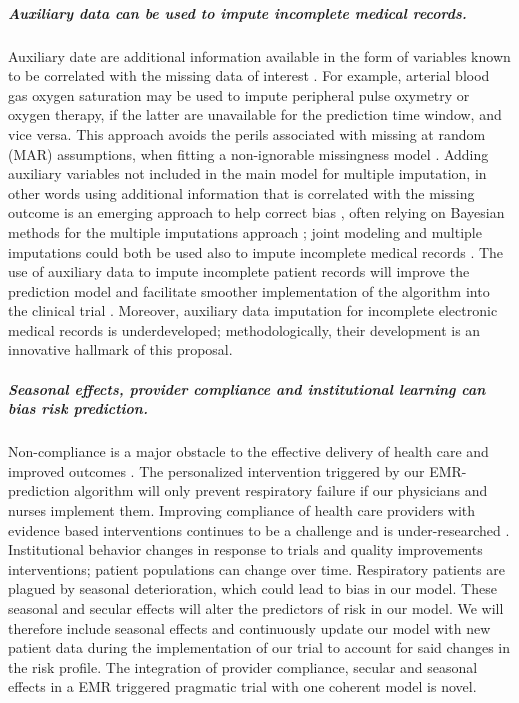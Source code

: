 \documentclass[11pt,notitlepage]{article}
\begin{document}
\subparagraph*{Auxiliary data can be used to impute incomplete medical records.}
Auxiliary date are additional information available in the form of variables known to be correlated with the missing data of interest \cite{Daniels24571539}. For example, arterial blood gas oxygen saturation may be used to impute peripheral pulse oxymetry or oxygen therapy, if the latter are unavailable for the prediction time window, and vice versa. This approach avoids the perils associated with missing at random (MAR) assumptions, when fitting a non-ignorable missingness model \cite{Wang_20029935}. Adding auxiliary variables not included in the main model for multiple imputation, in other words using additional information that is correlated with the missing outcome is an emerging approach to help correct bias \cite{Meng_1994, Collins_11778676, Rubin_1996}, often relying on Bayesian methods for the multiple imputations approach \cite{Daniels_2008, Schafer_1997}; joint modeling and multiple imputations could both be used also to impute incomplete medical records \cite{Fitzmaurice_2008}. The use of auxiliary data to impute incomplete patient records will improve the prediction model and facilitate smoother implementation of the algorithm into the clinical trial \cite{Hall_25389642}. Moreover, auxiliary data imputation for incomplete electronic medical records is underdeveloped; methodologically, their development is an innovative hallmark of this proposal.

\subparagraph*{Seasonal effects, provider compliance and institutional learning can bias risk prediction.} 
Non-compliance is a major obstacle to the effective delivery of health care and improved outcomes \cite{Duncan_16710766}. The personalized intervention triggered by our EMR-prediction algorithm will only prevent respiratory failure if our physicians and nurses implement them. Improving compliance of health care providers with evidence based interventions continues to be a challenge and is under-researched \cite{Davis_7650822}. Institutional behavior changes in response to trials and quality improvements interventions; patient populations can change over time. Respiratory patients are plagued by seasonal deterioration, which could lead to bias in our model. These seasonal and secular effects will alter the predictors of risk in our model. We will therefore include seasonal effects and continuously update our model with new patient data during the implementation of our trial to account for said changes in the risk profile. The integration of provider compliance, secular and seasonal effects in a EMR triggered pragmatic trial with one coherent model is novel. 
\end{document}
